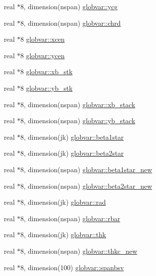 \begin{DoxyCompactItemize}
\item 
real $\ast$8, dimension(nspan) \hyperlink{namespaceglobvar_a7c65a1d76a91eab0217e09e6be6d2eb0}{globvar\+::ycg}
\item 
real $\ast$8, dimension(nspan) \hyperlink{namespaceglobvar_a55febb83fd05cacf2e926878777e3515}{globvar\+::chrd}
\item 
real $\ast$8 \hyperlink{namespaceglobvar_afe183ce32de3adfc403b0f269a275676}{globvar\+::xcen}
\item 
real $\ast$8 \hyperlink{namespaceglobvar_ac64739121560b1c588700a14f6bc9cae}{globvar\+::ycen}
\item 
real $\ast$8 \hyperlink{namespaceglobvar_ab9824c9f8dcc0e337df800037acfff86}{globvar\+::xb\+\_\+stk}
\item 
real $\ast$8 \hyperlink{namespaceglobvar_a50b0561e08ecd21444c8d0138e8f23f8}{globvar\+::yb\+\_\+stk}
\item 
real $\ast$8, dimension(nspan) \hyperlink{namespaceglobvar_ac7d10e840db27451a3d4f7281e998936}{globvar\+::xb\+\_\+stack}
\item 
real $\ast$8, dimension(nspan) \hyperlink{namespaceglobvar_ab911e9efe95d91973d67032e07c25b6e}{globvar\+::yb\+\_\+stack}
\item 
real $\ast$8, dimension(jk) \hyperlink{namespaceglobvar_abb730f89383edc04d1631f6dc16ad5c6}{globvar\+::beta1star}
\item 
real $\ast$8, dimension(jk) \hyperlink{namespaceglobvar_a1504d995004c2c3cd93ac71f6c9028e0}{globvar\+::beta2star}
\item 
real $\ast$8, dimension(nspan) \hyperlink{namespaceglobvar_a9b66a28ec78457551885e4ad3091f8fe}{globvar\+::beta1star\+\_\+new}
\item 
real $\ast$8, dimension(nspan) \hyperlink{namespaceglobvar_aa2687515a32abc133ab720b0690976ba}{globvar\+::beta2star\+\_\+new}
\item 
real $\ast$8, dimension(jk) \hyperlink{namespaceglobvar_a66d44e4ebb72e4d0700987fd6cff1e02}{globvar\+::rad}
\item 
real $\ast$8, dimension(nspan) \hyperlink{namespaceglobvar_aa830e5df47d2204dc7cfc6ad28e887df}{globvar\+::rbar}
\item 
real $\ast$8, dimension(jk) \hyperlink{namespaceglobvar_a72f67f1398b816e48706e6277e566566}{globvar\+::thk}
\item 
real $\ast$8, dimension(nspan) \hyperlink{namespaceglobvar_a6e2bc84f532e605dfbeec7244ae6a981}{globvar\+::thkc\+\_\+new}
\item 
real $\ast$8, dimension(100) \hyperlink{namespaceglobvar_a6d99aeec6935f58b70f503a823d5f085}{globvar\+::spanbsv}

\end{DoxyCompactItemize}
